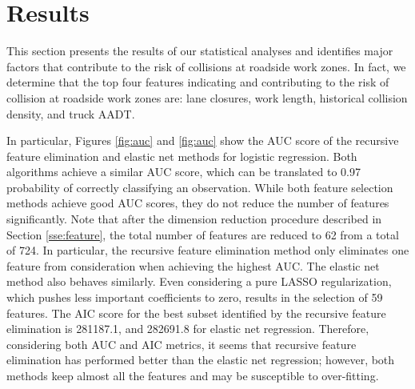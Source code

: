 \documentclass[10pt,a4paper]{article}
\begin{document}
\section{Results} \label{se:results}
This section presents the results of our statistical analyses and identifies major factors that contribute to the risk of collisions at roadside work zones. In fact, we determine that the top four features indicating and contributing to the risk of collision at roadside work zones are: lane closures, work length, historical collision density, and truck AADT.

In particular, Figures \ref{fig:auc} and \ref{fig:auc} show the AUC score of the recursive feature elimination and elastic net methods for logistic regression. Both algorithms achieve a similar AUC score, which can be translated to 0.97 probability of correctly classifying an observation. While both feature selection methods achieve good AUC scores, they do not reduce the number of features significantly. Note that after the dimension reduction procedure described in Section \ref{sse:feature}, the total number of features are reduced to 62 from a total of 724. In particular, the recursive feature elimination method only eliminates one feature from consideration when achieving the highest AUC. The elastic net method also behaves similarly. Even considering a pure LASSO regularization, which pushes less important coefficients to zero, results in the selection of 59 features. The AIC score for the best subset identified by the recursive feature elimination is 281187.1, and 282691.8 for elastic net regression. Therefore, considering both AUC and AIC metrics, it seems that recursive feature elimination has performed better than the elastic net regression; however, both methods keep almost all the features and may be susceptible to over-fitting.
\end{document}
